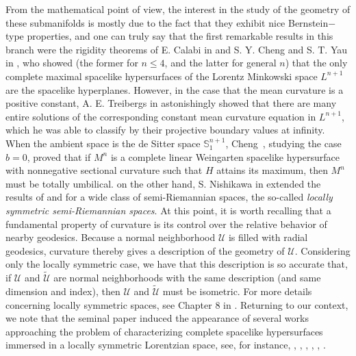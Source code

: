 \documentclass[leqno,11pt]{amsart}
\theoremstyle{plain}
\theoremstyle{definition}
\numberwithin{equation}{section}
\begin{document}
From the mathematical point of view, the interest in the study of the geometry of these submanifolds is mostly due to the fact that they exhibit nice Bernstein$-$type properties, and one can truly say that the first remarkable results in this branch were the rigidity theorems of E. Calabi in \cite{Calabi: 70} and S. Y. Cheng and S. T. Yau in \cite{Cheng: 76}, who showed (the former for $n \leq 4$, and the latter for general $n$) that the only complete maximal spacelike hypersurfaces of the Lorentz Minkowski space $L^{n+1}$ are the spacelike hyperplanes. However, in the case that the mean curvature is a positive constant, A. E. Treibergs in \cite{Treibergs:82} astonishingly showed that there are many entire solutions of the corresponding constant mean curvature equation in $L^{n+1}$, which he was able to classify by their projective boundary values at infinity. When the ambient space is the de Sitter space $\mathbb S_{1}^{n+1}$, Cheng~\cite{Cheng: 90}, studying the case $b=0$, proved that if $M^{n}$ is a complete linear Weingarten spacelike hypersurface with nonnegative sectional curvature such that $H$ attains its maximum, then $M^{n}$ must be totally umbilical. on the other hand, S. Nishikawa in \cite{Nishikawa: 84} extended the results of \cite{Calabi: 70} and \cite{Cheng: 76} for a wide class of semi-Riemannian spaces, the so-called \emph{locally symmetric semi-Riemannian spaces}. At this point, it is worth recalling that a fundamental property of curvature is its control over the relative behavior of nearby geodesics. Because a normal neighborhood $\mathcal{U}$ is filled with radial geodesics, curvature thereby gives a description of the geometry of $\mathcal{U}$. Considering only the locally symmetric case, we have that this description is so accurate that, if $\mathcal{U}$ and $\tilde{\mathcal{U}}$ are normal neighborhoods with the same description (and same dimension and index), then $\mathcal{U}$ and $\tilde{\mathcal{U}}$ must be isometric. For more details concerning locally symmetric spaces, see Chapter 8 in \cite{O'Neill:83}. Returning to our context, we note that the seminal paper \cite{Nishikawa: 84} induced the appearance of several works approaching the problem of characterizing complete spacelike hypersurfaces immersed in a locally symmetric Lorentzian space, see, for instance, \cite{Baek: 04}, \cite{Lima: 13}, \cite{Lima: 13B}, \cite{Lima: 16B}, \cite{deLima:2017}, \cite{Liu: 10}. 
\end{document}
